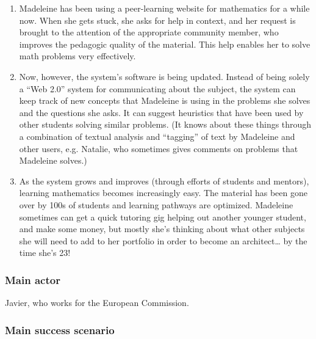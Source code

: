 \begin{enumerate}
\item
  Madeleine has been using a peer-learning website for mathematics for a
  while now. When she gets stuck, she asks for help in context, and her
  request is brought to the attention of the appropriate community
  member, who improves the pedagogic quality of the material. This help
  enables her to solve math problems very effectively.
\item
  Now, however, the system's software is being updated. Instead of being
  solely a ``Web 2.0'' system for communicating about the subject, the
  system can keep track of new concepts that Madeleine is using in the
  problems she solves and the questions she asks. It can suggest
  heuristics that have been used by other students solving similar
  problems. (It knows about these things through a combination of
  textual analysis and ``tagging'' of text by Madeleine and other users,
  e.g. Natalie, who sometimes gives comments on problems that Madeleine
  solves.)
\item
  As the system grows and improves (through efforts of students and
  mentors), learning mathematics becomes increasingly easy. The material
  has been gone over by 100s of students and learning pathways are
  optimized. Madeleine sometimes can get a quick tutoring gig helping
  out another younger student, and make some money, but mostly she's
  thinking about what other subjects she will need to add to her
  portfolio in order to become an architect\ldots{} by the time she's
  23!
\end{enumerate}
\subsubsection{Main actor}

Javier, who works for the European Commission.

\subsubsection{Main success scenario}

